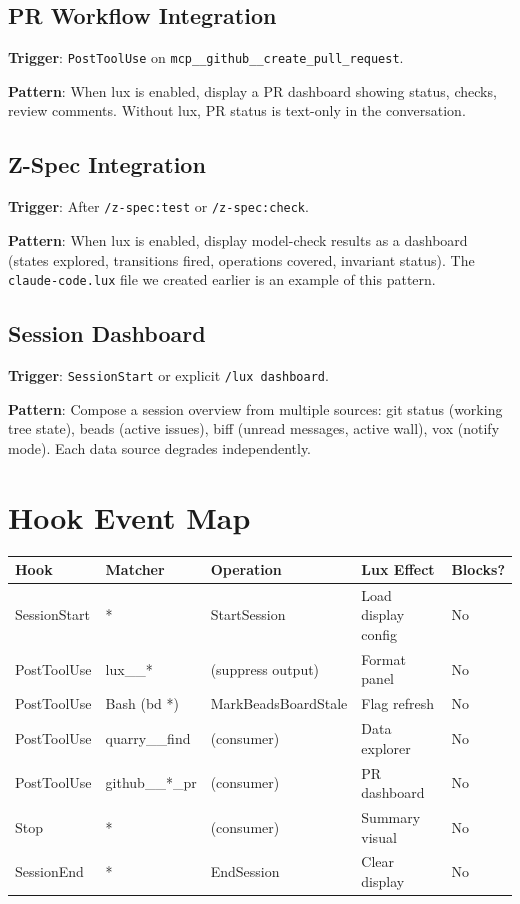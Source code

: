 \documentclass[a4paper,10pt,fleqn]{article}
\begin{document}
\subsection{PR Workflow Integration}

\textbf{Trigger}: \texttt{PostToolUse} on
\texttt{mcp\_\_github\_\_create\_pull\_request}.

\textbf{Pattern}: When lux is enabled, display a PR dashboard
showing status, checks, review comments. Without lux, PR status is
text-only in the conversation.

\subsection{Z-Spec Integration}

\textbf{Trigger}: After \texttt{/z-spec:test} or \texttt{/z-spec:check}.

\textbf{Pattern}: When lux is enabled, display model-check results
as a dashboard (states explored, transitions fired, operations covered,
invariant status). The \texttt{claude-code.lux} file we created earlier
is an example of this pattern.

\subsection{Session Dashboard}

\textbf{Trigger}: \texttt{SessionStart} or explicit \texttt{/lux dashboard}.

\textbf{Pattern}: Compose a session overview from multiple sources:
git status (working tree state), beads (active issues), biff
(unread messages, active wall), vox (notify mode). Each data source
degrades independently.

\section{Hook Event Map}

\begin{tabular}{lllll}
\hline
\textbf{Hook} & \textbf{Matcher} & \textbf{Operation} & \textbf{Lux Effect} & \textbf{Blocks?} \\
\hline
SessionStart & * & StartSession & Load display config & No \\
PostToolUse & lux\_\_* & (suppress output) & Format panel & No \\
PostToolUse & Bash (bd *) & MarkBeadsBoardStale & Flag refresh & No \\
PostToolUse & quarry\_\_find & (consumer) & Data explorer & No \\
PostToolUse & github\_\_*\_pr & (consumer) & PR dashboard & No \\
Stop & * & (consumer) & Summary visual & No \\
SessionEnd & * & EndSession & Clear display & No \\
\hline
\end{tabular}
\end{document}
